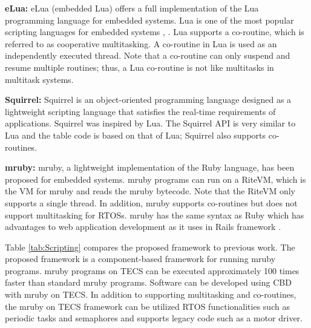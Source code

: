\documentclass[a4j,12pt,oneside,openany,english]{jsbook}
\begin{document}
{\bf eLua:}
eLua (embedded Lua) offers a full implementation of the Lua programming language for embedded systems.
Lua is one of the most popular scripting languages for embedded systems \cite{url:Lua}, \cite{par:Lua}.
Lua supports a co-routine, which is referred to as cooperative multitasking.
A co-routine in Lua is used as an independently executed thread.
Note that a co-routine can only suspend and resume multiple routines; thus, a Lua co-routine is not like multitasks in multitask systems.

{\bf Squirrel:}
Squirrel is an object-oriented programming language designed as a lightweight scripting language that satisfies the real-time requirements of applications.
Squirrel was inspired by Lua.
The Squirrel API is very similar to Lua and the table code is based on that of Lua; Squirrel also supports co-routines.

{\bf mruby:}
mruby, a lightweight implementation of the Ruby language, has been proposed for embedded systems.
mruby programs can run on a RiteVM, which is the VM for mruby and reads the mruby bytecode.
Note that the RiteVM only supports a single thread.
In addition, mruby supports co-routines but does not support multitasking for RTOSs.
mruby has the same syntax as Ruby which has advantages to web application development as it uses in Rails framework \cite{url:rubyonrails}.

Table \ref{tab:Scripting} compares the proposed framework to previous work.
The proposed framework is a component-based framework for running mruby programs.
mruby programs on TECS can be executed approximately 100 times faster than standard mruby programs.
Software can be developed using CBD with mruby on TECS.
In addition to supporting multitasking and co-routines, the mruby on TECS framework can be utilized RTOS functionalities such as periodic tasks and semaphores and supports legacy code such as a motor driver.
\end{document}
